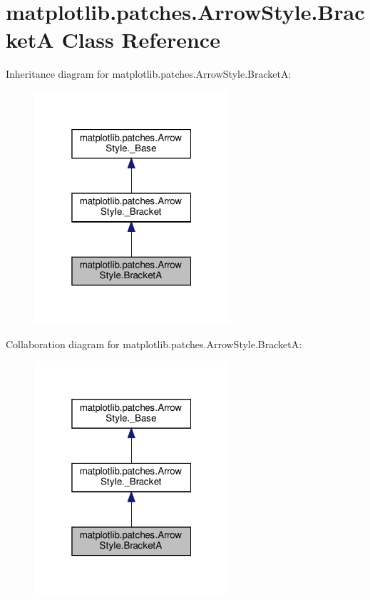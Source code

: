 \hypertarget{classmatplotlib_1_1patches_1_1ArrowStyle_1_1BracketA}{}\section{matplotlib.\+patches.\+Arrow\+Style.\+BracketA Class Reference}
\label{classmatplotlib_1_1patches_1_1ArrowStyle_1_1BracketA}


Inheritance diagram for matplotlib.\+patches.\+Arrow\+Style.\+BracketA\+:
\nopagebreak
\begin{figure}[H]
\begin{center}
\leavevmode
\includegraphics[width=205pt]{classmatplotlib_1_1patches_1_1ArrowStyle_1_1BracketA__inherit__graph}
\end{center}
\end{figure}


Collaboration diagram for matplotlib.\+patches.\+Arrow\+Style.\+BracketA\+:
\nopagebreak
\begin{figure}[H]
\begin{center}
\leavevmode
\includegraphics[width=205pt]{classmatplotlib_1_1patches_1_1ArrowStyle_1_1BracketA__coll__graph}
\end{center}
\end{figure}
